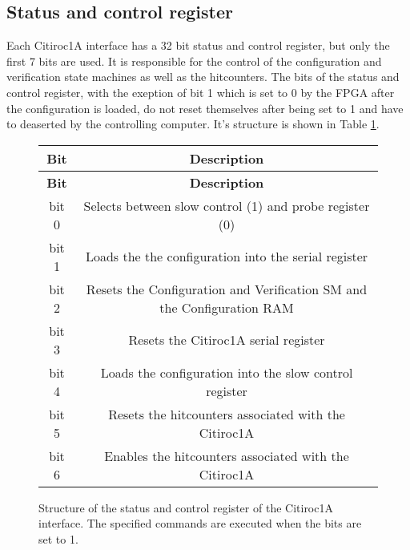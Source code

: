 \subsection{Status and control register}
Each Citiroc1A interface has a 32 bit status and control register, but only the first 7 bits are used.
 It is responsible for the control of the configuration and verification state machines as well as the hitcounters.
 The bits of the status and control register, with the exeption of bit 1 which is set to 0 by the FPGA after the configuration is loaded,
do not reset themselves after being set to 1 and have to deaserted by  the controlling computer.
\newline
It's structure is shown in Table \ref{tab:status_control_register}.
\begin{figure}  
    \centering
\begin{longtable}{|c|c|}
    \hline
    \textbf{Bit} & \textbf{Description} \\
    \hline
    \endfirsthead
    
    \hline
    \textbf{Bit} & \textbf{Description} \\
    \hline
    \endhead
    
    \hline
    \endfoot
    
    \hline
    \endlastfoot
    bit 0 & Selects between slow control (1) and probe register (0) \\
    bit 1 & Loads the the configuration into the serial register\\
    bit 2 & Resets the Configuration and Verification SM and the Configuration RAM \\
    bit 3 & Resets the  Citiroc1A serial register \\
    bit 4 & Loads the configuration into the slow control register \\
    bit 5 & Resets the hitcounters associated with the Citiroc1A \\
    bit 6 & Enables the hitcounters associated with the Citiroc1A \\
    \hline
    \end{longtable}
    \caption{Structure of the status and control register of the Citiroc1A interface. 
    The specified commands are executed when the bits are set to 1. }  
    \label{tab:status_control_register}
\end{figure}  
  
